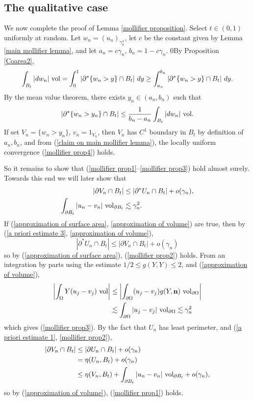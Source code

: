 
\subsection{The qualitative case}
We now complete the proof of Lemma \ref{mollifier proposition}.
Select $t \in (0, 1)$ uniformly at random.
Let $w_n = (u_n)_{\gamma_n^4}$, let $c$ be the constant given by Lemma \ref{main mollifier lemma}, and let $a_n = c\gamma_n$, $b_n = 1 - c\gamma_n$.
0By Proposition \ref{Coarea2},
$$\int_{B_t} |dw_n| ~\mathrm{vol} = \int_0^1 |\partial^* \{w_n > y\} \cap B_t| ~dy \geq \int_{a_n}^{b_n} |\partial^* \{w_n > y\} \cap B_t| ~dy.$$
By the mean value theorem, there exists $y_n \in (a_n, b_n)$ such that
\begin{equation}\label{MVT mollifier}
|\partial^* \{w_n > y_n\} \cap B_t| \leq \frac{1}{b_n - a_n} \int_{B_t} |dw_n| ~\mathrm{vol}.
\end{equation}
If set $V_n = \{w_n > y_n\}$, $v_n = 1_{V_n}$, then $V_n$ has $C^1$ boundary in $B_t$ by definition of $a_n, b_n$, and from (\ref{claim on main mollifier lemma}), the locally uniform convergence (\ref{mollifier prop4}) holds.

So it remains to show that (\ref{mollifier prop1}--\ref{mollifier prop3}) hold almost surely.
Towards this end we will later show that
\begin{align}
|\partial V_n \cap B_t| &\leq |\partial^* U_n \cap B_t| + o(\gamma_n), \label{approximation of surface area} \\
\int_{\partial B_t} |u_n - v_n| ~\mathrm{vol}_{\partial B_t} &\lesssim \gamma_n^2. \label{approximation of volume}
\end{align}
If (\ref{approximation of surface area}, \ref{approximation of volume}) are true,
then by (\ref{a priori estimate 3}, \ref{approximation of volume}),
$$|\partial^* U_n \cap B_t| \leq |\partial V_n \cap B_t| + o(\gamma_n)$$
so by (\ref{approximation of surface area}), (\ref{mollifier prop2}) holds.
From an integration by parts using the estimate $1/2 \leq g(Y, Y) \leq 2$, and (\ref{approximation of volume}),
\begin{align*}
\left|\int_\Omega Y(u_j - v_j) ~\mathrm{vol}\right|
&\leq \left|\int_{\partial \Omega} (u_j - v_j)g(Y, \mathbf n) ~\mathrm{vol}_{\partial \Omega}\right| \\
&\lesssim \int_{\partial \Omega} |u_j - v_j| ~\mathrm{vol}_{\partial \Omega} \lesssim \gamma_n^2
\end{align*}
which gives (\ref{mollifier prop3}).
By the fact that $U_n$ has least perimeter, and (\ref{a priori estimate 1}, \ref{mollifier prop2}),
\begin{align*}
|\partial V_n \cap B_t| &\leq |\partial U_n \cap B_t| + o(\gamma_n) \\
&= \eta(U_n, B_t) + o(\gamma_n)\\
&\leq \eta(V_n, B_t) + \int_{\partial B_t} |u_n - v_n| ~\mathrm{vol}_{\partial B_t} + o(\gamma_n),
\end{align*}
so by (\ref{approximation of volume}), (\ref{mollifier prop1}) holds.

